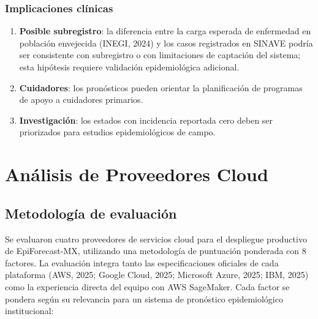 \documentclass[12pt, letterpaper]{article}
\begin{document}
\subsubsection{Implicaciones clínicas}

\begin{enumerate}[noitemsep]
    \item \textbf{Posible subregistro}: la diferencia entre la carga esperada de enfermedad en población envejecida (INEGI, 2024) y los casos registrados en SINAVE podría ser consistente con subregistro o con limitaciones de captación del sistema; esta hipótesis requiere validación epidemiológica adicional.
    \item \textbf{Cuidadores}: los pronósticos pueden orientar la planificación de programas de apoyo a cuidadores primarios.
    \item \textbf{Investigación}: los estados con incidencia reportada cero deben ser priorizados para estudios epidemiológicos de campo.
\end{enumerate}

\newpage
\section{Análisis de Proveedores Cloud}\label{sec:cloud}

\subsection{Metodología de evaluación}

Se evaluaron cuatro proveedores de servicios cloud para el despliegue productivo de EpiForecast-MX, utilizando una metodología de puntuación ponderada con 8 factores. La evaluación integra tanto las especificaciones oficiales de cada plataforma (AWS, 2025; Google Cloud, 2025; Microsoft Azure, 2025; IBM, 2025) como la experiencia directa del equipo con AWS SageMaker. Cada factor se pondera según su relevancia para un sistema de pronóstico epidemiológico institucional:
\end{document}
